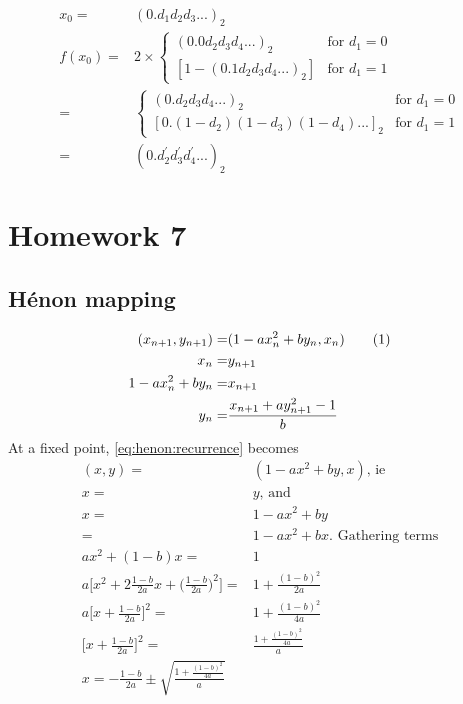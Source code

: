 \documentclass[]{article}
\newcommand\numberthis{\addtocounter{equation}{1}\tag{\theequation}}
\begin{document}
\begin{align*}
	x_0 =& (0.d_1 d_2 d_3 ...)_2\\
	f(x_0) =& 2 \times \begin{cases}
		(0.0 d_2 d_3 d_4...)_2 & \text{for } d_1 = 0\\
		[1- (0.1 d_2 d_3 d_4...)_2] & \text{for } d_1 = 1
	\end{cases}\\
		=& \begin{cases}
			(0.d_2 d_3 d_4...)_2 & \text{for } d_1 = 0\\
			[0.(1-d_2) (1-d_3) (1-d_4)...]_2 & \text{for } d_1 = 1
		\end{cases}\\
	=& (0.d^\prime_2 d^\prime_3 d^\prime_4 ...)_2
\end{align*}
\section{Homework 7}
\subsection{H\'enon mapping}
\cite{henon1976two}
\begin{align*}
	(x_{n+1},y_{n+1}) =& (1-ax_n^2+by_n,x_n) \numberthis \label{eq:henon:recurrence}\\
	x_n =& y_{n+1}\\
	1-ax_n^2+by_n =& x_{n+1}\\
	y_n =& \frac{x_{n+1} + a  y_{n+1}^2-1}{b}
\end{align*}
At a fixed point, \eqref{eq:henon:recurrence} becomes
\begin{align*}
	(x,y) =& (1-ax^2+by,x)\text{, ie}\\
	x =& y \text{, and}\\
	x =& 1-ax^2 +by\\
	=& 1-ax^2 +bx\text{. Gathering terms}\\
	ax^2 + (1-b)x = &1\\
	a\big[x^2 + 2\frac{1-b}{2a}x + \big(\frac{1-b}{2a}\big)^2\big]  = &1+ \frac{(1-b)^2}{2a}\\
	a\big[x+ \frac{1-b}{2a}\big]^2= &1+ \frac{(1-b)^2}{4a}\\
	\big[x+ \frac{1-b}{2a}\big]^2= &\frac{1+ \frac{(1-b)^2}{4a}}{a}\\
	x = - \frac{1-b}{2a} \pm \sqrt{\frac{1+ \frac{(1-b)^2}{4a}}{a}}
\end{align*}


\end{document}
